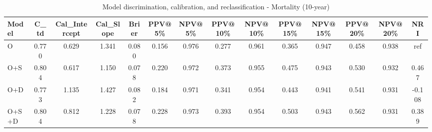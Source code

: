 \begin{table}[htbp]
\centering
\small
\caption{Model discrimination, calibration, and reclassification - Mortality (10-year)}
\label{tab:perf_mortality_10y}
\begin{tabular}{lccccccccccccc}
\toprule
Model & C\_td & Cal\_Intercept & Cal\_Slope & Brier & PPV@5\% & NPV@5\% & PPV@10\% & NPV@10\% & PPV@15\% & NPV@15\% & PPV@20\% & NPV@20\% & NRI \\
\midrule
O & 0.770 & 0.629 & 1.341 & 0.080 & 0.156 & 0.976 & 0.277 & 0.961 & 0.365 & 0.947 & 0.458 & 0.938 & ref \\
O+S & 0.804 & 0.617 & 1.150 & 0.078 & 0.220 & 0.972 & 0.373 & 0.955 & 0.475 & 0.943 & 0.530 & 0.932 & 0.467 \\
O+D & 0.773 & 1.135 & 1.427 & 0.082 & 0.184 & 0.971 & 0.341 & 0.954 & 0.443 & 0.941 & 0.541 & 0.931 & -0.108 \\
O+S+D & 0.804 & 0.812 & 1.228 & 0.078 & 0.228 & 0.973 & 0.393 & 0.954 & 0.503 & 0.943 & 0.562 & 0.931 & 0.389 \\
\bottomrule
\end{tabular}
\end{table}
